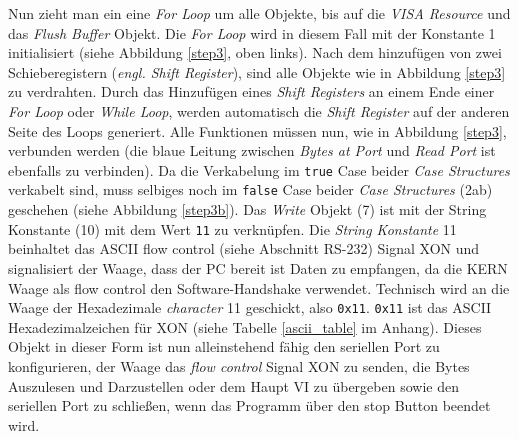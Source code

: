 Nun zieht man ein eine \textit{For Loop} um alle Objekte, bis auf die \textit{VISA Resource} und das \textit{Flush Buffer} Objekt. Die \textit{For Loop} wird in diesem Fall mit der Konstante 1 initialisiert (siehe Abbildung \ref{step3}, oben links). Nach dem hinzufügen von zwei Schieberegistern (\textit{engl. Shift Register}), sind alle Objekte wie in Abbildung \ref{step3} zu verdrahten. Durch das Hinzufügen eines \textit{Shift Registers} an einem Ende einer \textit{For Loop} oder \textit{While Loop}, werden automatisch die \textit{Shift Register} auf der anderen Seite des Loops generiert. Alle Funktionen müssen nun, wie in Abbildung \ref{step3}, verbunden werden (die blaue Leitung zwischen \textit{Bytes at Port} und \textit{Read Port} ist ebenfalls zu verbinden). Da die \glqq Verkabelung\grqq{} im \texttt{true} Case beider \textit{Case Structures} verkabelt sind, muss selbiges noch im \texttt{false} Case beider \textit{Case Structures} (2ab) geschehen (siehe Abbildung \ref{step3b}). Das \textit{Write} Objekt (7) ist mit der String Konstante (10) mit dem Wert \texttt{11} zu verknüpfen. Die \textit{String Konstante} 11 beinhaltet das ASCII flow control (siehe Abschnitt RS-232) Signal XON und signalisiert der Waage, dass der PC bereit ist Daten zu empfangen, da die KERN Waage als flow control den Software-Handshake verwendet. Technisch wird an die Waage der Hexadezimale \textit{character} 11 geschickt, also \texttt{0x11}. \texttt{0x11} ist das ASCII Hexadezimalzeichen für XON (siehe Tabelle \ref{ascii_table} im Anhang).  Dieses Objekt in dieser Form ist nun alleinstehend fähig den seriellen Port zu konfigurieren, der Waage das \textit{flow control} Signal XON zu senden, die Bytes Auszulesen und Darzustellen oder dem Haupt VI zu übergeben sowie den seriellen Port zu schließen, wenn das Programm über den stop Button beendet wird.

